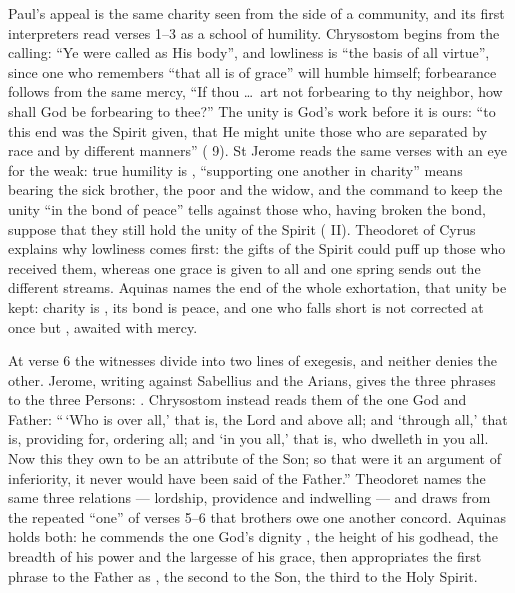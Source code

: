 Paul's appeal is the same charity seen from the side of a community, and its
first interpreters read verses 1--3 as a school of humility. Chrysostom begins
from the calling: ``Ye were called as His body'', and lowliness is ``the basis
of all virtue'', since one who remembers ``that all is of grace'' will humble
himself; forbearance follows from the same mercy, ``If thou \dots\ art not
forbearing to thy neighbor, how shall God be forbearing to thee?'' The unity is
God's work before it is ours: ``to this end was the Spirit given, that He might
unite those who are separated by race and by different manners''
( 9). St Jerome reads the same verses with an eye for the weak: true
humility is , ``supporting one another
in charity'' means bearing the sick brother, the poor and the widow, and the
command to keep the unity ``in the bond of peace'' tells against those who,
having broken the bond, suppose that they still hold the unity of the Spirit
( II). Theodoret of Cyrus explains
why lowliness comes first: the gifts of the Spirit could puff up those who
received them, whereas one grace is given to all and one spring sends out the
different streams.
Aquinas names the end of the whole exhortation, that unity be kept: charity is
, its bond is peace, and one who falls short is not
corrected at once but , awaited with mercy.

At verse 6 the witnesses divide into two lines of exegesis, and neither denies
the other. Jerome, writing against Sabellius and the Arians, gives the three
phrases to the three Persons:
. Chrysostom instead reads them of the one
God and Father: ``\,`Who is over all,' that is, the Lord and above all; and
`through all,' that is, providing for, ordering all; and `in you all,' that is,
who dwelleth in you all. Now this they own to be an attribute of the Son; so
that were it an argument of inferiority, it never would have been said of the
Father.'' Theodoret names the same three relations --- lordship, providence and
indwelling --- and draws from the repeated ``one'' of verses 5--6 that
brothers owe one another concord. Aquinas holds both: he commends the one
God's dignity , the height of his godhead, the breadth of his
power and the largesse of his grace, then appropriates the first phrase to the
Father as , the second to the Son, the
third to the Holy Spirit.


